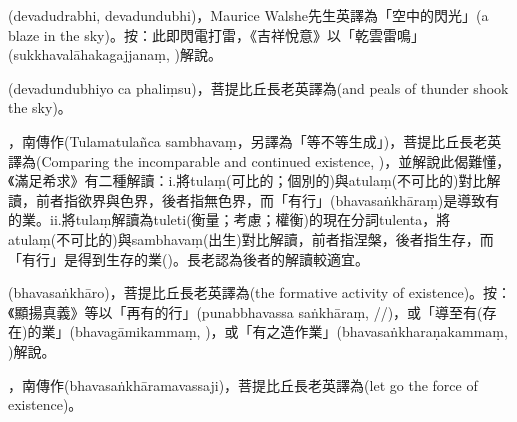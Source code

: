 \startitemgroup[noteitems]
\item{}(devadudrabhi, devadundubhi)，Maurice Walshe先生英譯為「空中的閃光」(a blaze in the sky)。按：此即閃電打雷，《吉祥悅意》以「乾雲雷鳴」(sukkhavalāhakagajjanaṃ, )解說。
\item{}(devadundubhiyo ca phaliṃsu)，菩提比丘長老英譯為(and peals of thunder shook the sky)。
\stopitemgroup

\startitemgroup[noteitems]
\item{}，南傳作(Tulamatulañca sambhavaṃ，另譯為「等不等生成」)，菩提比丘長老英譯為(Comparing the incomparable and continued existence, )，並解說此偈難懂，《滿足希求》有二種解讀：i.將tulaṃ(可比的；個別的)與atulaṃ(不可比的)對比解讀，前者指欲界與色界，後者指無色界，而「有行」(bhavasaṅkhāraṃ)是導致有的業。ii.將tulaṃ解讀為tuleti(衡量；考慮；權衡)的現在分詞tulenta，將atulaṃ(不可比的)與sambhavaṃ(出生)對比解讀，前者指涅槃，後者指生存，而「有行」是得到生存的業()。長老認為後者的解讀較適宜。
\stopitemgroup

\startitemgroup[noteitems]
\item{}(bhavasaṅkhāro)，菩提比丘長老英譯為(the formative activity of existence)。按：《顯揚真義》等以「再有的行」(punabbhavassa saṅkhāraṃ, //)，或「導至有(存在)的業」(bhavagāmikammaṃ, )，或「有之造作業」(bhavasaṅkharaṇakammaṃ, )解說。
\item{}，南傳作(bhavasaṅkhāramavassaji)，菩提比丘長老英譯為(let go the force of existence)。
\stopitemgroup

